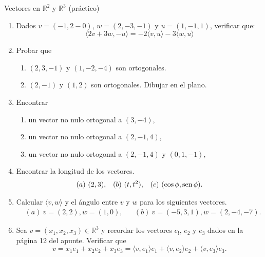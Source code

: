 \begin{chapter}{Vectores en $\mathbb R^2$ y $\mathbb R^3$ (práctico)}
\begin{enumerate}
\item Dados $v = (-1, 2-0)$, $w = (2,-3,-1)$  y $u = (1,-1,1)$, verificar que:
\begin{equation*}
	\langle 2v + 3w , -u   \rangle = -2\langle v ,u \rangle -3 \langle w , u  \rangle
\end{equation*}



\item Probar  que 
\begin{enumerate}
	\item $(2,3,-1)$ y $(1, -2, -4)$ son ortogonales.
	\item $(2,-1)$ y $(1,2)$ son ortogonales. Dibujar en el plano. 
\end{enumerate}


\item Encontrar 
\begin{enumerate}
	\item un vector no nulo ortogonal  a $(3,-4)$,
	\item un vector no nulo ortogonal a $(2,-1,4)$,
	\item un vector no nulo ortogonal a $(2,-1,4)$ y $(0,1,-1)$,
\end{enumerate}


\item Encontrar la longitud de los vectores.
\begin{align*}
&(a) \ (2,3), && (b) \ (t,t^2), & (c) \ (\cos\phi,\sen\phi).
\end{align*}


\item Calcular $\langle v , w  \rangle$ y el {\'a}ngulo entre $v$ y $w$  para los siguientes vectores.
\begin{align*}
&(a) \ v=(2,2), w=(1,0), &&  (b) \  v=(-5,3,1), w=(2,-4,-7).
\end{align*}


\item Sea $v=(x_1,x_2,x_3)\in\mathbb{R}^3$ y recordar los vectores $e_!$, $e_2$ y $e_3$ dados en la p\'agina 12 del apunte. Verificar que 
$$v=x_1e_1+x_2e_2+x_3e_3=\langle v,e_1\rangle e_1+\langle v,e_2\rangle e_2+\langle v,e_3\rangle e_3.$$



\end{enumerate}
\end{chapter}
